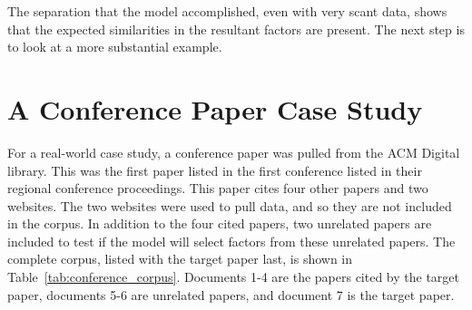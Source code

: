 \documentclass[../ut-dissertation.tex]{subfiles}
\begin{document}
The separation that the model accomplished, even with very scant data,
shows that the expected similarities in the resultant factors are
present.  The next step is to look at a more substantial example.


\section{A Conference Paper Case Study}
For a real-world case study, a conference paper was pulled from the
ACM Digital library.  This was the first paper listed in the first
conference listed in their regional conference proceedings.  This
paper cites four other papers and two websites.  The two websites were
used to pull data, and so they are not included in the corpus.  In
addition to the four cited papers, two unrelated papers are included
to test if the model will select factors from these unrelated papers.
The complete corpus, listed with the target paper last, is shown in
Table~\ref{tab:conference_corpus}. Documents 1-4 are the papers cited
by the target paper, documents 5-6 are unrelated papers, and document
7 is the target paper.
\end{document}
